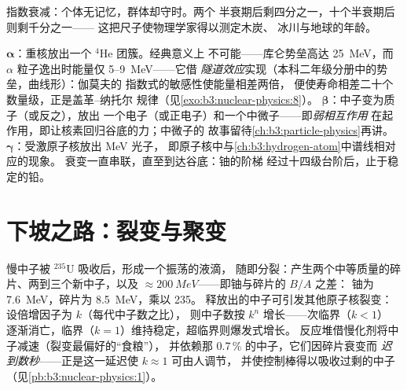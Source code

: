 \begin{omfigure}

{\small 指数衰减：个体无记忆，群体却守时。两个
半衰期后剩四分之一，十个半衰期后则剩千分之一——
这把尺子使物理学家得以测定木炭、
冰川与地球的年龄。}
\end{omfigure}

\begin{remark}[原子核的三条出路]\label{rem:b3:nuclear-physics:modes}
$\boldsymbol\alpha$：重核放出一个 $^4$He 团簇。经典意义上
不可能——库仑势垒高达 \qty{25}{MeV}，而
$\alpha$ 粒子逸出时能量仅 \qty{5}{}--\qty{9}{MeV}——它借
\emph{隧道效应}实现（本科二年级分册中的势垒，曲线形）：伽莫夫的
指数式的敏感性使能量相差两倍，
便使寿命相差二十个数量级，正是盖革–纳托尔
规律（见\cref{exo:b3:nuclear-physics:8}）。
$\boldsymbol\beta$：中子变为质子（或反之），放出
一个电子（或正电子）和一个中微子——即\emph{弱相互作用}
在起作用，即让核素回归谷底的力；中微子的
故事留待\cref{ch:b3:particle-physics}再讲。
$\boldsymbol\gamma$：受激原子核放出 \unit{MeV} 光子，
即原子核中与\cref{ch:b3:hydrogen-atom}中谱线相对应的现象。
衰变一直串联，直至到达谷底：铀的阶梯
经过十四级台阶后，止于稳定的铅。
\end{remark}

\section{下坡之路：裂变与聚变}

\begin{proposition}[裂变与链式反应]\label{prop:b3:nuclear-physics:fission}
慢中子被 $^{235}$U 吸收后，形成一个振荡的液滴，
随即分裂：产生两个中等质量的碎片、两到三个新中子，以及
$\approx\qty{200}{MeV}$——即铀与碎片的 $B/A$ 之差：
铀为 \qty{7.6}{MeV}，碎片为 \qty{8.5}{MeV}，乘以 235。
释放出的中子可引发其他原子核裂变：
设倍增因子为 $k$（每代中子数之比），
则中子数按 $k^n$ 增长——次临界（$k < 1$）
逐渐消亡，临界（$k = 1$）维持稳定，超临界则爆发式增长。
反应堆借慢化剂将中子减速（裂变最偏好的“食粮”），
并依赖那 0.7\,\% 的中子，它们因碎片衰变而
\emph{迟到数秒}——正是这一延迟使 $k \approx 1$ 可由人调节，
并使控制棒得以吸收过剩的中子
（见\cref{pb:b3:nuclear-physics:1}）。
\end{proposition}
\admitted

